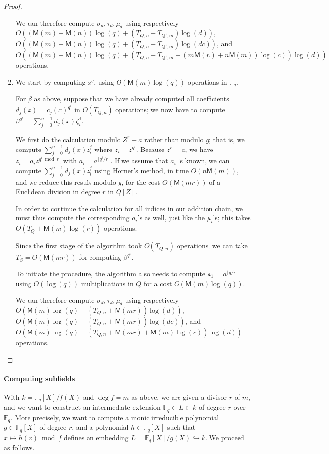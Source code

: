 \documentclass[12pt]{article}
\theoremstyle{plain}
\theoremstyle{definition}
\def\F{\ensuremath{\mathbb{F}}}
\def\MM{\ensuremath{\mathsf{M}}}
\newcounter{algorithm}
\begin{document}
\begin{proof}
\begin{enumerate}[label=\textbf{Case~\theenumi.},leftmargin=*, align=left]
  We can therefore compute $\sigma_d, \tau_d, \mu_d$ using respectively
  $O((\MM(m)+\MM(n))\log(q) + (T_{Q,n}+T_{Q',m})\log(d))$,
  $O((\MM(m)+\MM(n))\log(q) + (T_{Q,n}+T_{Q',m})\log(d c))$,
  and $O((\MM(m)+\MM(n))\log(q) + (T_{Q,n}+T_{Q',m} + (m\MM(n)+n\MM(m))\log(c))\log(d))$ operations.

\item
  We start by computing $x^q$, using $O(\MM(m)\log(q))$ operations in
  $\F_q$.

  For $\beta$ as above, suppose that we have already computed all
  coefficients $d_j(x)=c_j(x)^{q^i}$ in $O(T_{Q,n})$ operations;
  we now have to compute $\beta^{q^i} = \sum_{j=0}^{n-1} d_j(x) \zeta_i^j$.

  We first do the calculation modulo $Z^r-a$ rather than modulo $g$;
  that is, we compute $\sum_{j=0}^{n-1} d_j(x) z_i^j$ where
  $z_i=z^{q^i}$.
  Because $z^r=a$, we
  have $z_i = a_i z^{q^i \bmod r}$, with $a_i =
  a^{\lfloor q^i/r\rfloor}$. If we assume that $a_i$ is
  known, we can compute $\sum_{j=0}^{n-1} d_j(x) z_i^j$ using
  Horner's method, in time $O(n \MM(m))$, and we reduce this result
  modulo $g$, for the cost $O(\MM(mr))$ of a Euclidean division in
  degree $r$ in $Q[Z]$. 

  In order to continue the calculation for all indices in our addition
  chain, we must thus compute the corresponding $a_i$'s as well,
  just like the $\mu_i$'s;
  this takes $O(T_{Q}+\MM(m)\log(r))$ operations.

  Since the first stage of the algorithm took $O(T_{Q,n})$ operations,
  we can take $T_S = O(\MM(mr))$
  for computing $\beta^{q^i}$.
  
  To initiate the procedure, the algorithm also needs to compute
  $a_1=a^{\lfloor q/r\rfloor}$, using $O(\log(q))$
  multiplications in $Q$ for a cost $O(\MM(m)\log(q))$.

  We can therefore compute $\sigma_d, \tau_d, \mu_d$ using respectively
  $O(\MM(m)\log(q) + (T_{Q,n} + \MM(mr))\log(d))$,
  $O(\MM(m)\log(q) + (T_{Q,n} + \MM(mr))\log(d c))$,
  and $O(\MM(m)\log(q) + (T_{Q,n} + \MM(mr) + \MM(m)\log(c))\log(d))$ operations.
  \qedhere
\end{enumerate}
\end{proof}

\paragraph{Computing subfields}
With $k = \F_q[X]/f(X)$ and $\deg f=m$ as above, we are given a
divisor $r$ of $m$, and we want to construct an intermediate extension
$\F_q \subset L \subset k$ of degree $r$ over $\F_q$. More precisely,
we want to compute a monic irreducible polynomial $g \in \F_q[X]$ of
degree $r$, and a polynomial $h \in \F_q[X]$ such that
$x \mapsto h(x)\bmod f$ defines an embedding
$L = \F_q[X] / g(X) \hookrightarrow k$. We proceed as follows.
\end{document}
